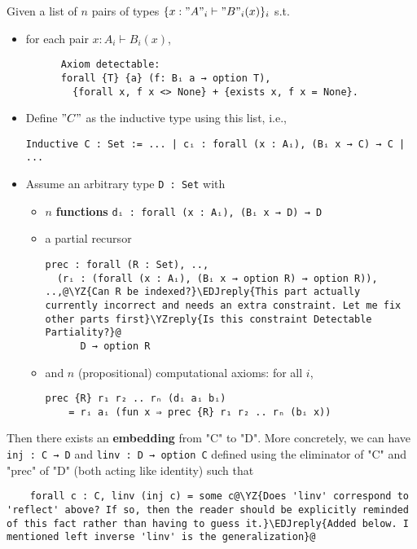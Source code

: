 \begin{theorem}\label{thm:prec-complete} Given a list of $n$ pairs of types $\{ x : "A"_i \vdash "B"_i(x) \}_{i}$ s.t.


  \begin{itemize}
    \item {} for each pair $x : A_i \vdash B_i(x)$,
    \begin{verbatim}
      Axiom detectable:
      forall {T} {a} (f: Bᵢ a → option T),
        {forall x, f x <> None} + {exists x, f x = None}.
    \end{verbatim} 
    \item Define $"C"$ as the inductive type using this list, i.e.,
    \begin{verbatim}
Inductive C : Set := ... | cᵢ : forall (x : Aᵢ), (Bᵢ x → C) → C | ...
    \end{verbatim}
    \item Assume an arbitrary type \texttt{D : Set} with
    \begin{itemize}
      \item $n$ \textbf{functions} \texttt{dᵢ : forall (x : Aᵢ), (Bᵢ x → D) → D}  
      \item a partial recursor
      \begin{verbatim}
prec : forall (R : Set), ..,
  (rᵢ : (forall (x : Aᵢ), (Bᵢ x → option R) → option R)), ..,@\YZ{Can R be indexed?}\EDJreply{This part actually currently incorrect and needs an extra constraint. Let me fix other parts first}\YZreply{Is this constraint Detectable Partiality?}@
      D → option R
      \end{verbatim}
      \item and $n$ (propositional) computational axioms: for all $i$, 
      \begin{verbatim}
prec {R} r₁ r₂ .. rₙ (dᵢ aᵢ bᵢ) 
    = rᵢ aᵢ (fun x ⇒ prec {R} r₁ r₂ .. rₙ (bᵢ x))
      \end{verbatim}
    \end{itemize}
  \end{itemize}
  Then there exists an \textbf{embedding} from "C" to "D".
  More concretely, we can have \texttt{inj : C → D} and 
  \texttt{linv : D → option C} defined using the eliminator of\/
  "C" and "prec" of\/ "D" (both acting like identity) such that
  \begin{verbatim}
    forall c : C, linv (inj c) = some c@\YZ{Does 'linv' correspond to 'reflect' above? If so, then the reader should be explicitly reminded of this fact rather than having to guess it.}\EDJreply{Added below. I mentioned left inverse 'linv' is the generalization}@
  \end{verbatim}
\end{theorem}
